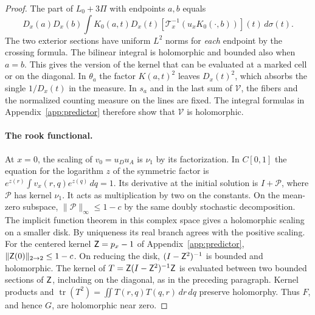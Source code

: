 \begin{proof}
The part of \(L_0+3\Pi\) with endpoints \(a,b\) equals
\[
 D_x(a)D_x(b)\int K_0(a,t)D_x(t)
     [\mathcal T_x^{-1}(u_x K_0(\cdot,b))](t)\,d\sigma(t).
\]
The two exterior sections have uniform \(L^2\) norms for \emph{each} endpoint by the crossing formula.
The bilinear integral is holomorphic and bounded also when \(a=b\). This gives the version of the kernel
that can be evaluated at a marked cell or on the diagonal. In \(\theta_a\) the factor \(K(a,t)^2\) leaves
\(D_x(t)^2\), which absorbs the single \(1/D_x(t)\) in the measure. In \(s_a\) and in the last sum of
\(\mathcal V\), the fibers and the normalized counting measure on the lines are fixed. The integral
formulas in Appendix~\ref{app:predictor} therefore show that \(\mathcal V\) is holomorphic.

\paragraph{The rook functional.}
At \(x=0\), the scaling of \(v_0=u_Du_A\) is \(\nu_1\) by its factorization. In \(C[0,1]\) the equation
for the logarithm \(z\) of the symmetric factor is \(e^{z(r)}\int v_x(r,q)e^{z(q)}\,dq=1\). Its
derivative at the initial solution is \(I+\mathcal P\), where \(\mathcal P\) has kernel \(\nu_1\). It
acts as multiplication by two on the constants. On the mean-zero subspace, \(\|\mathcal
P\|_\infty\le1-c\) by the same doubly stochastic decomposition. The implicit function theorem in this
complex space gives a holomorphic scaling on a smaller disk. By uniqueness its real branch agrees with
the positive scaling. For the centered kernel \(\mathsf Z=p_x-1\) of Appendix~\ref{app:predictor},
\(\|\mathsf Z(0)\|_{2\to2}\le1-c\). On reducing the disk, \((I-\mathsf Z^2)^{-1}\) is bounded and
holomorphic. The kernel of \(T=\mathsf Z(I-\mathsf Z^2)^{-1}\mathsf Z\) is evaluated between two bounded
sections of \(\mathsf Z\), including on the diagonal, as in the preceding paragraph. Kernel products and
\(\operatorname{tr}(T^2)=\iint T(r,q)T(q,r)\,dr\,dq\) preserve holomorphy. Thus \(F\), and hence \(G\),
are holomorphic near zero.


\end{proof}
